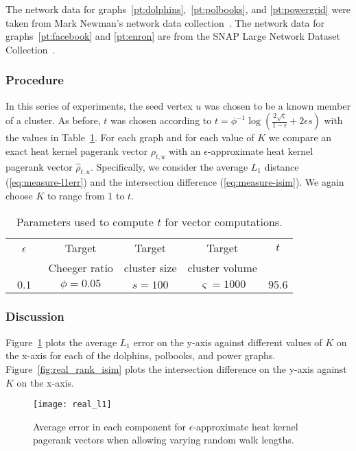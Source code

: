 \documentclass[runningheads,a4paper]{llncs}
\newcommand{\tparamcluster}{\phi^{-1}\log(\frac{2\sqrt{\varsigma}}{1-\epsilon} + 2\epsilon s)}
\begin{document}
The network data for graphs~\ref{pt:dolphins},~\ref{pt:polbooks}, and
\ref{pt:powergrid} were taken from Mark Newman's network data
collection~\cite{newmandata}.  The network data for graphs~\ref{pt:facebook} and
\ref{pt:enron} are from the SNAP Large Network Dataset
Collection~\cite{snapdata}.

\subsubsection{Procedure} In this series of experiments, the seed vertex $u$ was
chosen to be a known member of a cluster.  As before, $t$ was chosen according
to $t=\tparamcluster$ with the values in Table~\ref{table:realrankingparams}.
For each graph and for each value of $K$ we compare an exact heat kernel
pagerank vector $\rho_{t,u}$ with an $\epsilon$-approximate heat kernel pagerank
vector $\hat{\rho}_{t,u}$.  Specifically, we consider the average $L_1$ distance
(\ref{eq:measure-l1err}) and the intersection difference
(\ref{eq:measure-isim}).  We again choose $K$ to range from $1$ to $t$.

\begin{table}
\centering
\begin{tabular}{|c|c|c|c|c|}
\hline
~~$\epsilon$~~ & Target        & Target       & Target         & $t$\\
               & Cheeger ratio & cluster size & cluster volume &\\
\hline
$0.1$ & $\phi = 0.05$ & $s = 100$ & $\varsigma = 1000$ & $95.6$\\
\hline
\end{tabular}
\caption{Parameters used to compute $t$ for vector computations.}
\label{table:realrankingparams} 
\end{table}

\subsubsection{Discussion}
Figure~\ref{fig:real_l1} plots the average $L_1$ error on the y-axis against
different values of $K$ on the x-axis for each of the dolphins, polbooks, and
power graphs.  Figure~\ref{fig:real_rank_isim} plots the intersection difference
on the y-axis against $K$ on the x-axis.

\begin{figure}
\centering
\texttt{[image: real\_l1]}
\caption{Average error in each component for $\epsilon$-approximate heat kernel
pagerank vectors when allowing varying random walk lengths.}
\label{fig:real_l1}
\end{figure}
\end{document}
